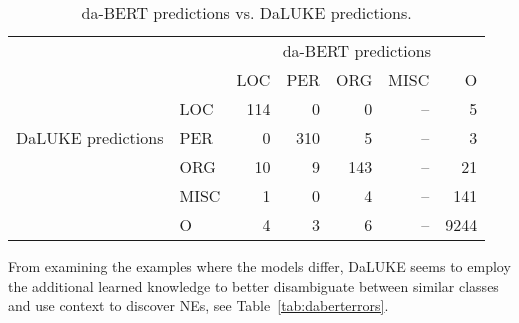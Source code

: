 \documentclass[main.tex]{subfiles}
\begin{document}
\begin{table}[H]
    \centering
    \begin{tabular}{l l | r r r r r }
        & &	\multicolumn{5}{c}{da-BERT predictions}	\\
        \multirow{5}{*}{DaLUKE predictions} & & LOC & PER & ORG & MISC & O \\\hline
        & LOC  & 114 & 0   & 0   &  --    & 5  \\
        & PER  & 0   & 310 & 5   &  --    & 3  \\
        & ORG  & 10  & 9   & 143 &  --    & 21 \\
        & MISC & 1   & 0   & 4   &  --    & 141\\
        & O    & 4   & 3   & 6   &  --    & 9244
    \end{tabular}
    \label{tab:dabertcompare}
    \caption{
        da-BERT predictions vs. DaLUKE predictions.
    }
\end{table}\noindent
From examining the examples where the models differ, DaLUKE seems to employ the additional learned knowledge to better disambiguate between similar classes and use context to discover NEs, see Table~\ref{tab:daberterrors}.
\end{document}
